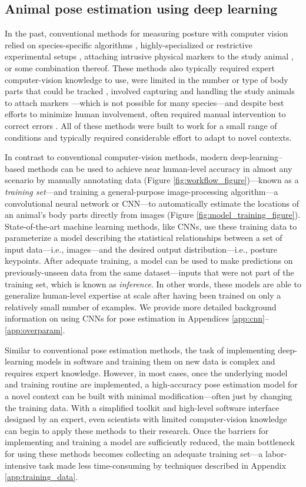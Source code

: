 \documentclass[11pt,a4paper,oneside]{book}
\begin{document}
\subsection{Animal pose estimation using deep learning}
In the past, conventional methods for measuring posture with computer vision relied on species-specific algorithms \citep{uhlmann2017flylimbtracker}, highly-specialized or restrictive experimental setups \citep{mendes2013quantification, kain2013leg}, attaching intrusive physical markers to the study animal \citep{kain2013leg}, or some combination thereof. These methods also typically required expert computer-vision knowledge to use, were limited in the number or type of body parts that could be tracked \citep{mendes2013quantification}, involved capturing and handling the study animals to attach markers \citep{kain2013leg}---which is not possible for many species---and despite best efforts to minimize human involvement, often required manual intervention to correct errors \citep{uhlmann2017flylimbtracker}. All of these methods were built to work for a small range of conditions and typically required considerable effort to adapt to novel contexts.

In contrast to conventional computer-vision methods, modern deep-learning–based methods can be used to achieve near human-level accuracy in almost any scenario by manually annotating data (Figure \ref{fig:workflow_figure})—known as a \textit{training set}—and training a general-purpose image-processing algorithm—a convolutional neural network or CNN—to automatically estimate the locations of an animal's body parts directly from images (Figure \ref{fig:model_training_figure}). State-of-the-art machine learning methods, like CNNs, use these training data to parameterize a model describing the statistical relationships between a set of input data—i.e., images—and the desired output distribution—i.e., posture keypoints. After adequate training, a model can be used to make predictions on previously-unseen data from the same dataset—inputs that were not part of the training set, which is known as \textit{inference}. In other words, these models are able to generalize human-level expertise at scale after having been trained on only a relatively small number of examples. We provide more detailed background information on using CNNs for pose estimation in Appendices \ref{app:cnn}–\ref{app:overparam}.

Similar to conventional pose estimation methods, the task of implementing deep-learning models in software and training them on new data is complex and requires expert knowledge. However, in most cases, once the underlying model and training routine are implemented, a high-accuracy pose estimation model for a novel context can be built with minimal modification—often just by changing the training data. With a simplified toolkit and high-level software interface designed by an expert, even scientists with limited computer-vision knowledge can begin to apply these methods to their research. Once the barriers for implementing and training a model are sufficiently reduced, the main bottleneck for using these methods becomes collecting an adequate training set—a labor-intensive task made less time-consuming by techniques described in Appendix \ref{app:training_data}.
\end{document}
